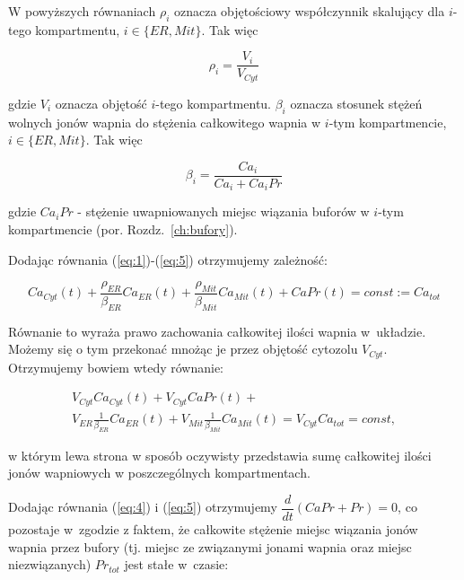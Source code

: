 \medskip 

\noindent W powyższych równaniach $\rho_i$ oznacza objętościowy współczynnik skalujący dla $i$-tego kompartmentu, $i \in \{ER, Mit\}$. 	Tak więc

	\begin{equation} \label{rhoi}
	\rho_i = \dfrac{V_{i}}{V_{Cyt}}
	\end{equation}
	
\noindent gdzie $V_i$ oznacza objętość $i$-tego kompartmentu. $\beta_i$ oznacza stosunek stężeń wolnych jonów wapnia do stężenia całkowitego wapnia w $i$-tym kompartmencie, $i \in \{ER, Mit\}$. Tak więc 
	
	\begin{equation} \label{beta_i} 
	\beta_i = \dfrac{Ca_{i}}{Ca_i + Ca_iPr}
	\end{equation}
	
\noindent gdzie $Ca_iPr$ - stężenie uwapniowanych miejsc wiązania buforów w $i$-tym kompartmencie (por. Rozdz.~\ref{ch:bufory}). 
		
\medskip 

Dodając równania (\ref{eq:1})-(\ref{eq:5}) otrzymujemy zależność: 


\begin{equation} \label{eq:cons:Ca}
Ca_{Cyt}(t) + \frac{\rho_{ER}}{\beta_{ER}}Ca_{ER}(t) 
+ \frac{\rho_{Mit}}{\beta_{Mit}}Ca_{Mit}(t) + CaPr(t) = const:=Ca_{tot} 
\end{equation}

\noindent Równanie to wyraża prawo zachowania całkowitej ilości wapnia w~układzie. Możemy się o tym przekonać mnożąc je przez objętość cytozolu $V_{Cyt}$. Otrzymujemy bowiem wtedy równanie: 

\begin{equation} \label{eq:cons:CaV}
\begin{array}{l}
V_{Cyt}Ca_{Cyt}(t) + V_{Cyt} CaPr(t) + \\[3ex] 
V_{ER} \frac{1}{\beta_{ER}}Ca_{ER}(t) 
+ V_{Mit} \frac{1}{\beta_{Mit}}Ca_{Mit}(t) = 
V_{Cyt} Ca_{tot} = const, 
\end{array}
\end{equation}

\noindent w którym lewa strona w sposób oczywisty przedstawia sumę całkowitej ilości jonów wapniowych w poszczególnych kompartmentach. 


Dodając równania (\ref{eq:4}) i (\ref{eq:5}) otrzymujemy $\dfrac{d}{dt} (CaPr + Pr) = 0$, co pozostaje w~zgodzie z faktem, że całkowite stężenie miejsc wiązania jonów wapnia przez bufory (tj. miejsc ze związanymi jonami wapnia oraz miejsc niezwiązanych) $Pr_{tot}$ jest stałe w~czasie: 
 
